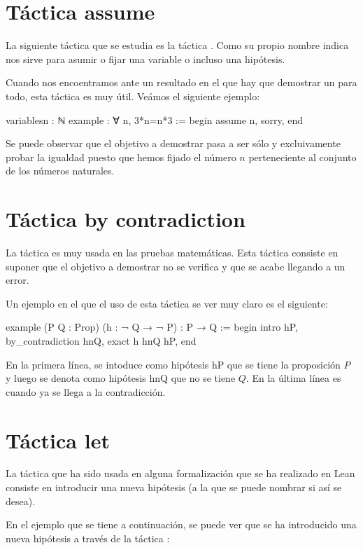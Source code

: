 \section{Táctica assume}
La siguiente táctica que se estudia es la táctica . Como
su propio nombre indica nos sirve para asumir o fijar una variable o incluso una
hipótesis.

Cuando nos encoentramos ante un resultado en el que hay que demostrar un para
todo, esta táctica es muy útil. Veámos el siguiente ejemplo:

\begin{leancode}
variables{n : ℕ}
example : ∀ n, 3*n=n*3 :=
begin
  assume n,
  sorry,
end
\end{leancode}

Se puede observar que el objetivo a demostrar pasa a ser sólo y excluivamente
probar la igualdad puesto que hemos fijado el número \(n\) perteneciente al
conjunto de los números naturales.


\section{Táctica by contradiction}
La táctica  es muy
usada en las pruebas matemáticas. Esta táctica consiste en suponer que el
objetivo a demostrar no se verifica y que se acabe llegando a  un error.

Un ejemplo en el que el uso de esta táctica se ver muy claro es el siguiente:

\begin{leancode}
example (P Q : Prop) (h : ¬ Q → ¬ P) : P → Q :=
begin
  intro hP,
  by_contradiction hnQ,
  exact h hnQ hP,
end
\end{leancode}

En la primera línea, se intoduce como hipótesis hP que se tiene la proposición
\(P\) y luego se denota como hipótesis hnQ que no se tiene \(Q\). En la última
línea es cuando ya se llega a la contradicción.

\section{Táctica let}
La táctica  que ha sido usada en alguna formalización que
se ha realizado en Lean consiste en introducir una nueva hipótesis (a la que
se puede nombrar si así se desea).

En el ejemplo que se tiene a continuación, se puede ver que se ha introducido
una nueva hipótesis a través de la táctica :

